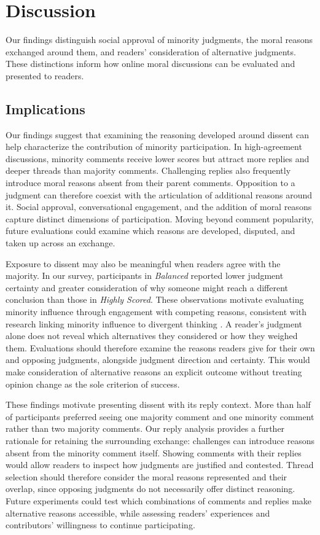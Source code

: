 \section{Discussion}
\label{sec:discussion}

Our findings distinguish social approval of minority judgments, the moral
reasons exchanged around them, and readers' consideration of alternative
judgments. These distinctions inform how online moral discussions can be
evaluated and presented to readers.

\subsection{Implications}
\label{subsec:discussion-findings}


Our findings suggest that examining the reasoning developed around dissent 
can help characterize the contribution of minority participation.
In high-agreement discussions, minority comments receive lower scores but attract more
replies and deeper threads than majority comments. Challenging replies
also frequently introduce moral reasons absent from their parent comments.
Opposition to a judgment can therefore coexist with the articulation of
additional reasons around it. Social approval, conversational engagement,
and the addition of moral reasons capture distinct dimensions of
participation. Moving beyond comment popularity, future evaluations
could examine which reasons are developed, disputed, and taken up
across an exchange.

Exposure to dissent may also be meaningful when readers agree with the
majority. In our survey, participants in \textit{Balanced}
reported lower judgment certainty and greater consideration of why
someone might reach a different conclusion than those in \textit{Highly Scored}.
These observations motivate evaluating minority influence through
engagement with competing reasons, consistent with research linking
minority influence to divergent thinking \cite{nemeth1987divergent}.
A reader's judgment alone does not reveal which alternatives they
considered or how they weighed them. Evaluations should therefore
examine the reasons readers give for their own and opposing judgments,
alongside judgment direction and certainty. This would make
consideration of alternative reasons an explicit outcome without
treating opinion change as the sole criterion of success.

These findings motivate presenting dissent with its reply context.
More than half of participants preferred seeing one majority comment and 
one minority comment rather than two majority comments.
Our reply analysis provides a further rationale for retaining the surrounding
exchange: challenges can introduce reasons absent from the minority
comment itself. Showing comments with their replies would allow readers
to inspect how judgments are justified and contested. Thread selection
should therefore consider the moral reasons represented and their
overlap, since opposing judgments do not necessarily offer distinct
reasoning. Future experiments could test which combinations of comments
and replies make alternative reasons accessible, while assessing
readers' experiences and contributors' willingness to continue
participating.


